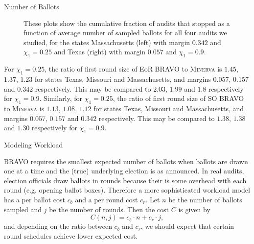 \documentclass[final]{beamer}
\newcommand{\Minerva}{\textsc{Minerva}\xspace}
\newcommand{\BRAVO}{\textsc{BRAVO}\xspace}
\newlength{\colwidth}
\begin{document}
\begin{frame}[t]
\begin{columns}[t]
\begin{column}{\colwidth}
\begin{block}{Number of Ballots}
\begin{figure}[h]
\begin{minipage}{.49\textwidth}
\begin{centering}
\label{fig:texas_90}
\end{centering}
\end{minipage}
\caption{These plots show the cumulative fraction of audits that stopped as a function of average number of sampled ballots for all four audits we studied, for the states Massachusetts (left) with margin $0.342$ and $\chi_1=0.25$ and Texas (right) with margin $0.057$ and $\chi_1=0.9$.}
\end{figure}

For $\chi_1=0.25$, the ratio of first round size of EoR \BRAVO to \Minerva is $1.45$, $1.37$, $1.23$ for states Texas, Missouri and Massachusetts, and margins $0.057$, $0.157$ and $0.342$ respectively. This may be compared to $2.03$, $1.99$ and $1.8$ respectively for $\chi_1=0.9$. Similarly, for $\chi_1=0.25$, the ratio of first round size of SO \BRAVO to \Minerva is $1.13$, $1.08$, $1.12$ for states Texas, Missouri and Massachusetts, and margins $0.057$, $0.157$ and $0.342$ respectively. This may be compared to $1.38$, $1.38$ and $1.30$ respectively for $\chi_1=0.9$. 


\end{block}


\begin{block}{Modeling Workload}

\BRAVO requires the smallest expected number of ballots when ballots are drawn one at a time and the (true) underlying election is as announced. 
In real audits, election officials draw ballots in rounds because their is some overhead with each round (e.g. opening ballot boxes).
Therefore a more sophisticated workload model has a per ballot cost $c_b$ and a per round cost $c_r$. 
Let $n$ be the number of ballots sampled and $j$ be the number of rounds. Then the cost $C$ is given by 
$$C(n,j) = c_b\cdot n + c_r\cdot j,$$
and depending on the ratio between $c_b$ and $c_r$, we should expect that certain round schedules
achieve lower expected cost.
 

\end{block}


\end{column}
\end{columns}
\end{frame}
\end{document}
